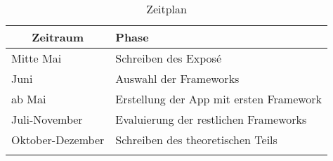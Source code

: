 \documentclass[a4paper,11pt,german,public]{INSOexpose}
\begin{document}
\begin{spacing}{1.4}
\begin{longtable}{|p{.3 \linewidth}|p{.5 \linewidth}|}
	\hline
	\multicolumn{1}{|c|}{\textbf{Zeitraum}} & \textbf{Phase} \\ 
	\hline 
	Mitte Mai & Schreiben des Exposé \\ 
	\hline 
	Juni & Auswahl der Frameworks \\
	\hline 
	ab Mai & Erstellung der App mit ersten Framework \\
	\hline 
	Juli-November & Evaluierung der restlichen Frameworks \\
	\hline 
	Oktober-Dezember & Schreiben des theoretischen Teils \\
	\hline
	\caption{Zeitplan}
	\label{tab:tabZeitplan}
\end{longtable}
\end{spacing}

\newpage
\nocite{dobjanschi:developing-android}
\nocite{tilko:rest}
\nocite{louis:android}
\nocite{stackOverflow:rest-client}
\nocite{burd:android}
\printbibliography
\end{document}
